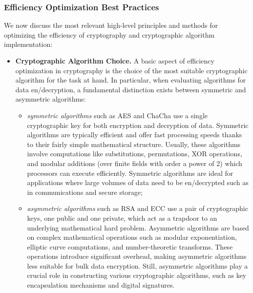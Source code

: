 \subsubsection{Efficiency Optimization Best Practices}\label{sec:security_of_cryptographic_algorithms:performance:best_practices}

We now discuss the most relevant high-level principles and methods for optimizing the efficiency of cryptography and cryptographic algorithm implementation:

\begin{itemize}
	
	\item \textbf{Cryptographic Algorithm Choice.} A basic aspect of efficiency optimization in cryptography is the choice of the most suitable cryptographic algorithm for the task at hand. In particular, when evaluating algorithms for data en/decryption, a fundamental distinction exists between symmetric and asymmetric algorithms:
	
	\begin{itemize}
		
		\item \textit{symmetric algorithms} such as AES and ChaCha use a single cryptographic key for both encryption and decryption of data. Symmetric algorithms are typically efficient and offer fast processing speeds thanks to their fairly simple mathematical structure. Usually, these algorithms involve computations like substitutions, permutations, XOR operations, and modular additions (over finite fields with order a power of 2) which processors can execute efficiently. Symmetric algorithms are ideal for applications where large volumes of data need to be en/decrypted such as in communications and secure storage;
		
		\item \textit{asymmetric algorithms} such as RSA and ECC use a pair of cryptographic keys, one public and one private, which act as a trapdoor to an underlying mathematical hard problem. Asymmetric algorithms are based on complex mathematical operations such as modular exponentiation, elliptic curve computations, and number-theoretic transforms. These operations introduce significant overhead, making asymmetric algorithms less suitable for bulk data encryption. Still, asymmetric algorithms play a crucial role in constructing various cryptographic algorithms, such as key encapsulation mechanisms and digital signatures.
		
	\end{itemize}


\end{itemize}
